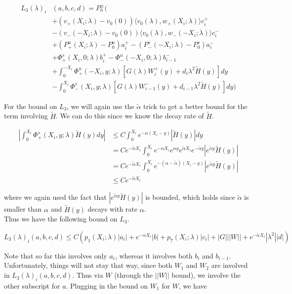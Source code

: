 \documentclass[12pt]{article}
\begin{document}
\begin{enumerate}
\begin{align*}
L_3(\lambda)_i&(a, b, c, d) = P_0^\pm \Big( \\
&+(v_+(X_i; \lambda) - v_0(0)) \langle v_0(\lambda), w_+(X_i; \lambda) \rangle c_i^+ \\
&- (v_-(-X_i; \lambda) - v_0(0)) \langle v_0(\lambda), w_-(-X_i; \lambda) \rangle c_i^- \\
&+ (P^u_+(X_i; \lambda) - P_0^u)a_i^+ - (P^s_-(-X_i; \lambda) - P_0^s)a_i^- \\
&+ \Phi^s_+(X_i, 0; \lambda)b_i^+ - \Phi^u_-(-X_i, 0; \lambda)b_{i-1}^- \\
&+ \int_0^{-X_i} \Phi^u_+(-X_i, y; \lambda) [ G(\lambda)W_i^+(y) + d_i \lambda^2 \tilde{H}(y) ] dy \\
&- \int_0^{X_i} \Phi^s_-(X_i, y; \lambda) [ G(\lambda)W_{i-1}^-(y) + d_{i-1} \lambda^2 \tilde{H}(y) ] dy \Big)
\end{align*}

For the bound on $L_3$, we will again use the $\tilde{\alpha}$ trick to get a better bound for the term involving $\tilde{H}$. We can do this since we know the decay rate of $\tilde{H}$.

\begin{align*}
\left| \int_0^{X_i} \Phi^s_+(X_i, y; \lambda) \tilde{H}(y) dy \right| 
&\leq C \int_0^{X_i} e^{-\alpha (X_i - y)}|\tilde{H}(y)| dy \\
&= C e^{-\tilde{\alpha}X_i} \int_0^{X_i} e^{-\alpha X_i} e^{\alpha y}  e^{\tilde{\alpha}X_i} e^{-\tilde{\alpha}y} |e^{\tilde{\alpha}y} \tilde{H}(y)| \\
&= C e^{-\tilde{\alpha}X_i} \int_0^{X_i} e^{-(\alpha - \tilde{\alpha})(X_i-y)} |e^{\tilde{\alpha}y} \tilde{H}(y)|\\
&\leq C e^{-\tilde{\alpha}X_i} 
\end{align*}

where we again used the fact that $|e^{\tilde{\alpha}y} \tilde{H}(y)|$ is bounded, which holds since $\tilde{\alpha}$ is smaller than $\alpha$ and $\tilde{H}(y)$ decays with rate $\alpha$.\\

Thus we have the following bound on $L_3$.

\[
L_3(\lambda)_i(a, b, c, d) \leq C ( p_1(X_i; \lambda)|a_i|
+ e^{-\alpha X_i}|b| + p_7(X_i; \lambda)|c_i| + |G| ||W|| + e^{-\tilde{\alpha} X_i} |\lambda^2| |d| )
\]

Note that so far this involves only $a_i$, whereas it involves both $b_i$ and $b_{i-1}$. Unfortunately, things will not stay that way, since both $W_1$ and $W_2$ are involved in $L_3(\lambda)_i(a, b, c, d)$. Thus via $W$ (through the $||W||$ bound), we involve the other subscript for $a$. Plugging in the bound on $W_1$ for $W$, we have


\end{enumerate}
\end{document}
